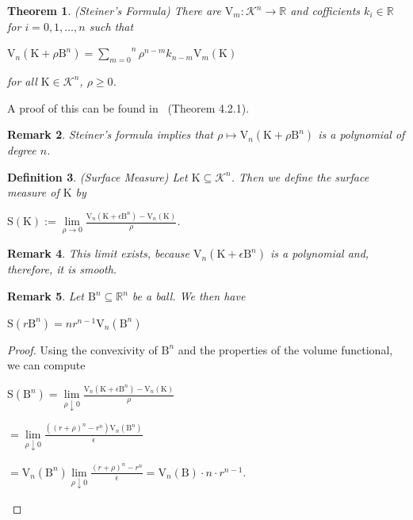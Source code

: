 \documentclass[a4paper]{book}
\newtheorem{theorem}{Theorem}%
\newtheorem{remark}[theorem]{Remark}%
\newtheorem{definition}[theorem]{Definition}%
\numberwithin{theorem}{section}%
\begin{document}
\begin{theorem}(Steiner's Formula)
    There are $\mathrm{V}_{m}:\mathscr{K}^{n}\to\mathbb{R}$ and cofficients $k_i\in\mathbb{R}$ for $i=0,1,\dots,n$ such that 
    \begin{center}
        $\mathrm{V}_{n}(\mathrm{K}+\rho\mathrm{B}^{n})=\overset{n}{\underset{m=0}{\sum}}\rho^{n-m}k_{n-m}\mathrm{V}_{m}(\mathrm{K})$
    \end{center}
    for all $\mathrm{K}\in\mathscr{K}^{n}$, $\rho\geq0$.
\end{theorem}
A proof of this can be found in~\citep{schneider2014convex} (Theorem 4.2.1).

\begin{remark}
    Steiner’s formula implies that $\rho\mapsto\mathrm{V}_{n}(\mathrm{K}+\rho\mathrm{B}^{n})$ is a polynomial of degree $n$.
\end{remark}

\begin{definition} (Surface Measure)
    Let $\mathrm{K}\subseteq\mathscr{K}^{n}$. Then we define the \textit{surface measure} of $\mathrm{K}$ by
    \begin{center}
        $\mathrm{S}(\mathrm{K}):=\underset{\rho\to0}{\lim}\frac{\mathrm{V}_{n}(\mathrm{K}+\epsilon\mathrm{B}^{n})-\mathrm{V}_{n}(\mathrm{K})}{\rho}$.
    \end{center}
\end{definition}

\begin{remark}
    This limit exists, because $\mathrm{V}_{n}(\mathrm{K}+\epsilon\mathrm{B}^{n})$ is a polynomial and, therefore, it is smooth.
\end{remark}

\begin{remark}
    Let $\mathrm{B}^{n}\subseteq\mathbb{R}^{n}$ be a ball. We then have
    \begin{center}
        $\mathrm{S}(r\mathrm{B}^{n})=nr^{n-1}\mathrm{V}_{n}(\mathrm{B}^{n})$
    \end{center}
\end{remark}
\begin{proof}
    Using the convexivity of $\mathrm{B}^{n}$ and the properties of the volume functional, we can compute
    \begin{center}
        $\displaystyle \mathrm{S}(\mathrm{B}^{n})=\underset{\rho\downarrow0}{\lim}\frac{\mathrm{V}_{n}(\mathrm{K}+\epsilon\mathrm{B}^{n})-\mathrm{V}_{n}(\mathrm{K})}{\rho}$

        $\displaystyle =\underset{\rho\downarrow0}{\lim}\frac{((r+\rho)^{n}-r^{n})\mathrm{V}_{n}(\mathrm{B}^{n})}{\epsilon}$

        $\displaystyle =\mathrm{V}_{n}(\mathrm{B}^{n})\underset{\rho\downarrow0}{\lim}\frac{(r+\rho)^{n}-r^{n}}{\epsilon}=\mathrm{V}_{n}(\mathrm{B})\cdot n\cdot r^{n-1}$.
    \end{center}
\end{proof}
\end{document}
